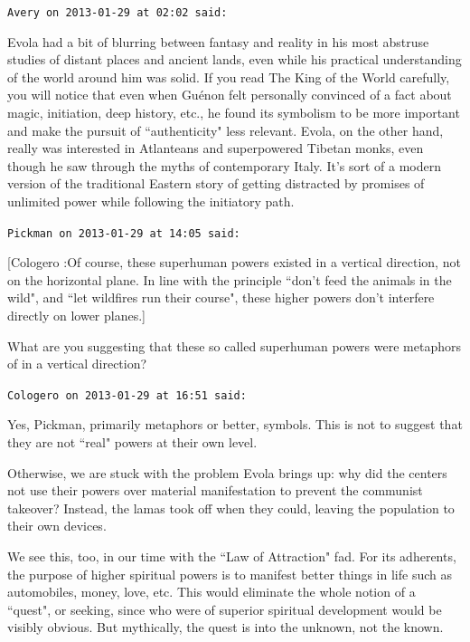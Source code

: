 \begin{footnotesize}
\begin{sffamily}
\hfill

\texttt{Avery on 2013-01-29 at 02:02 said: }

Evola had a bit of blurring between fantasy and reality in his most abstruse studies of distant places and ancient lands, even while his practical understanding of the world around him was solid. If you read The King of the World carefully, you will notice that even when Guénon felt personally convinced of a fact about magic, initiation, deep history, etc., he found its symbolism to be more important and make the pursuit of ``authenticity" less relevant. Evola, on the other hand, really was interested in Atlanteans and superpowered Tibetan monks, even though he saw through the myths of contemporary Italy. It's sort of a modern version of the traditional Eastern story of getting distracted by promises of unlimited power while following the initiatory path.


\hfill

\texttt{Pickman on 2013-01-29 at 14:05 said: }

[Cologero :Of course, these superhuman powers existed in a vertical direction, not on the horizontal plane. In line with the principle ``don't feed the animals in the wild", and ``let wildfires run their course", these higher powers don't interfere directly on lower planes.]

What are you suggesting that these so called superhuman powers were metaphors of in a vertical direction?


\hfill

\texttt{Cologero on 2013-01-29 at 16:51 said: }

Yes, Pickman, primarily metaphors or better, symbols. This is not to suggest that they are not ``real" powers at their own level.

Otherwise, we are stuck with the problem Evola brings up: why did the centers not use their powers over material manifestation to prevent the communist takeover? Instead, the lamas took off when they could, leaving the population to their own devices.

We see this, too, in our time with the ``Law of Attraction" fad. For its adherents, the purpose of higher spiritual powers is to manifest better things in life such as automobiles, money, love, etc. This would eliminate the whole notion of a ``quest", or seeking, since who were of superior spiritual development would be visibly obvious. But mythically, the quest is into the unknown, not the known.


\end{sffamily}\end{footnotesize}
